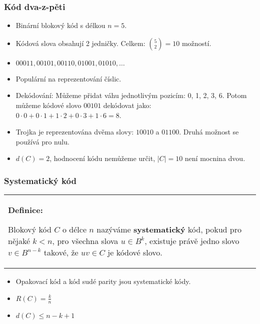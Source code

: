 \documentclass{beamer}
\newenvironment{definice}
{
    \begin{center}
    \begin{tabular}{p{9cm}}
    \textbf{Definice:}
}
{
    \end{tabular}
    \end{center}
}
\newenvironment{itemizex}%
  {\large \begin{itemize}%
    \setlength{\itemsep}{8pt}%
    \setlength{\parskip}{8pt}}%
  {\end{itemize}}
\newenvironment{itemize4}%
  {\large \begin{itemize}%
    \setlength{\itemsep}{4pt}%
    \setlength{\parskip}{4pt}}%
  {\end{itemize}}
\begin{document}
\begin{frame}[t,fragile]\frametitle{Kód dva-z-pěti} 
    \begin{itemize4}
        \item Binární blokový kód s délkou $n=5$.
        \item Kódová slova obsahují 2 jedničky. Celkem: ${5\choose2}=10$ možností.
        \item $00011, 00101, 00110,01001,01010,\dots$
        \item Populární na reprezentování číslic. 
        \item Dekódování: Můžeme přidat váhu jednotlivým pozicím: 0, 1, 2, 3, 6. Potom můžeme kódové slovo $00101$ dekódovat jako: $0\cdot0+0\cdot1+1\cdot2+0\cdot3+1\cdot6=8$.
        \item Trojka je reprezentována dvěma slovy: $10010$ a $01100$. Druhá možnost se používá pro nulu. 
        \item $d(C)=2$, hodnocení kódu nemůžeme určit, $|C|=10$ není mocnina dvou.
    \end{itemize4}
\end{frame}


\begin{frame}[t,fragile]\frametitle{Systematický kód} 
\begin{definice}
Blokový kód $C$ o délce $n$ nazýváme \textbf{systematický} kód, pokud pro nějaké $k<n$, pro všechna slova $u\in B^k$, existuje právě jedno slovo $v\in B^{n-k}$ takové, že $uv\in C$ je kódové slovo.
\end{definice}

\begin{itemizex}
    \item Opakovací kód a kód sudé parity jsou systematické kódy.
    \item $R(C)=\frac{k}{n}$
    \item $d(C)\le n-k+1$
\end{itemizex}
\end{frame}
\end{document}
